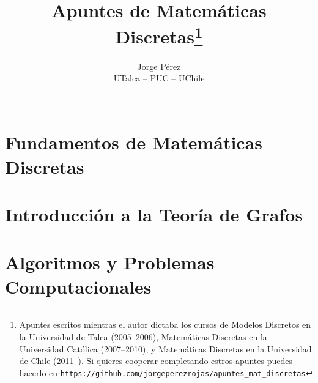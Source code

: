 \documentclass[letter]{report}
\begin{document}
\title{\Huge\bf Apuntes de Matem\'aticas Discretas\footnote{Apuntes escritos mientras el autor dictaba los cursos de Modelos Discretos en la Universidad de Talca (2005--2006), Matemáticas Discretas en la Universidad Católica (2007--2010), y Matemáticas Discretas en la Universidad de Chile (2011--).
Si quieres cooperar completando estros apuntes puedes hacerlo en \texttt{https://github.com/jorgeperezrojas/apuntes\_mat\_discretas}}}
\author{\LARGE Jorge P\'erez \vspace*{1em} \\ UTalca -- PUC -- UChile \\
\vspace*{15em} \\ %
}
\maketitle

\pagestyle{empty}
\thispagestyle{empty}
\tableofcontents
\chapter{Fundamentos de Matemáticas Discretas}
\setcounter{chapter}{1}
\thispagestyle{empty}

\newpage


\newpage


\newpage


\newpage


\newpage


\newpage



\newpage


\newpage
\thispagestyle{empty}
\setcounter{chapter}{1}
\chapter{Introducción a la Teoría de Grafos}
\thispagestyle{empty}

\newpage




\newpage


\newpage



\setcounter{chapter}{2}
\newpage
\thispagestyle{empty}
\chapter{Algoritmos y Problemas Computacionales}
\thispagestyle{empty}

\newpage


\newpage

\end{document}
